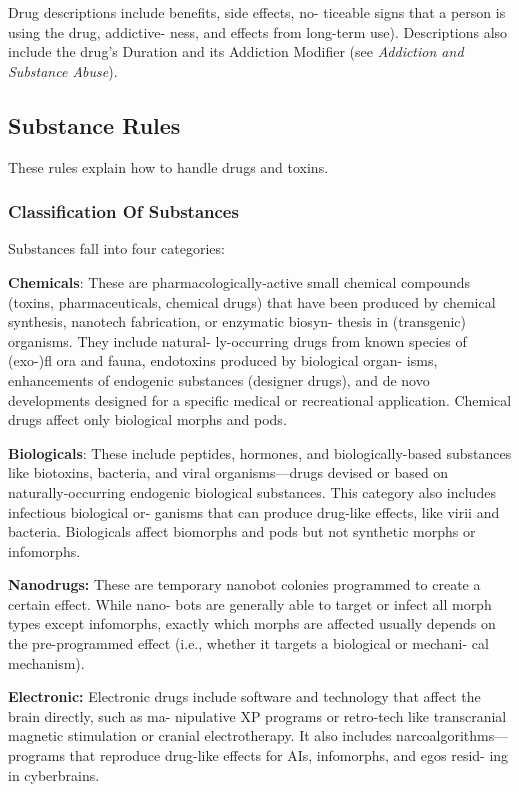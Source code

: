 Drug descriptions include benefits, side effects, no-
ticeable signs that a person is using the drug, addictive-
ness, and effects from long-term use). Descriptions also 
include the drug's Duration and its Addiction Modifier 
(see \textit{Addiction and Substance Abuse}).

\subsection{Substance Rules}

These rules explain how to handle drugs and toxins.

\subsubsection{Classification Of Substances}

Substances fall into four categories:

\textbf{Chemicals}: These are pharmacologically-active 
small chemical compounds (toxins, pharmaceuticals, 
chemical drugs) that have been produced by chemical 
synthesis, nanotech fabrication, or enzymatic biosyn-
thesis in (transgenic) organisms. They include natural-
ly-occurring drugs from known species of (exo-)fl ora 
and fauna, endotoxins produced by biological organ-
isms, enhancements of endogenic substances (designer 
drugs), and de novo developments designed for a 
specific medical or recreational application. Chemical 
drugs affect only biological morphs and pods.

\textbf{Biologicals}: These include peptides, hormones, and 
biologically-based substances like biotoxins, bacteria, 
and viral organisms—drugs devised or based on 
naturally-occurring endogenic biological substances. 
This category also includes infectious biological or-
ganisms that can produce drug-like effects, like virii 
and bacteria. Biologicals affect biomorphs and pods 
but not synthetic morphs or infomorphs.

\textbf{Nanodrugs: }These are temporary nanobot colonies 
programmed to create a certain effect. While nano-
bots are generally able to target or infect all morph 
types except infomorphs, exactly which morphs are 
affected usually depends on the pre-programmed 
effect (i.e., whether it targets a biological or mechani-
cal mechanism).

\textbf{Electronic: }Electronic drugs include software and 
technology that affect the brain directly, such as ma-
nipulative XP programs or retro-tech like transcranial 
magnetic stimulation or cranial electrotherapy. It also 
includes narcoalgorithms—programs that reproduce 
drug-like effects for AIs, infomorphs, and egos resid-
ing in cyberbrains.


